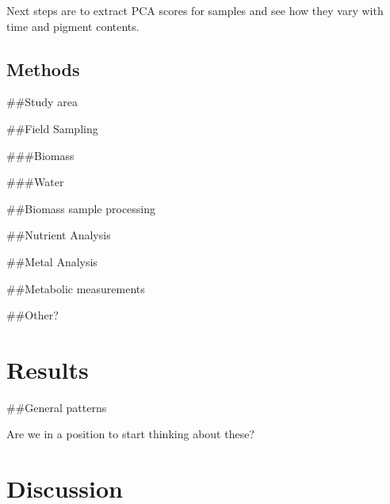 \documentclass[
]{article}
\begin{document}
\FloatBarrier

\newpage

Next steps are to extract PCA scores for samples and see how they vary
with time and pigment contents.

\hypertarget{methods}{%
\subsection{Methods}\label{methods}}

\#\#Study area

\#\#Field Sampling

\#\#\#Biomass

\#\#\#Water

\#\#Biomass sample processing

\#\#Nutrient Analysis

\#\#Metal Analysis

\#\#Metabolic measurements

\#\#Other?

\hypertarget{results}{%
\section{Results}\label{results}}

\#\#General patterns

Are we in a position to start thinking about these?

\hypertarget{discussion}{%
\section{Discussion}\label{discussion}}
\end{document}
